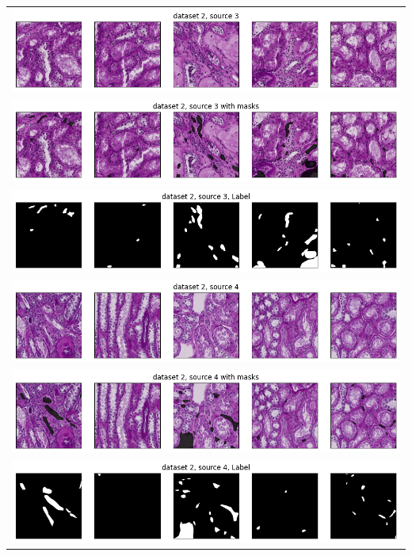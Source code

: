\begin{longtable}{c}
	\includegraphics[width=\textwidth]{gambar/bab4/ds2s3_0.png} \\
	\includegraphics[width=\textwidth]{gambar/bab4/ds2s3_1.png} \\
	\includegraphics[width=\textwidth]{gambar/bab4/ds2s3_2.png} \\
	
	\includegraphics[width=\textwidth]{gambar/bab4/ds2s4_0.png} \\
	\includegraphics[width=\textwidth]{gambar/bab4/ds2s4_1.png} \\
	\includegraphics[width=\textwidth]{gambar/bab4/ds2s4_2.png} \\
	
	
\end{longtable}

